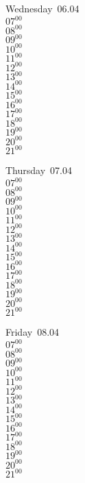 \documentclass[11pt,a4paper]{book}\usepackage[]{graphicx}\usepackage[]{color}
\begin{document}
\begin{weekdaybox}
  Wednesday~06.04\\
  { 
  \vfill
  $07^{00}$\\
$08^{00}$\\
$09^{00}$\\
$10^{00}$\\
$11^{00}$\\
$12^{00}$\\
$13^{00}$\\
$14^{00}$\\
$15^{00}$\\
$16^{00}$\\
$17^{00}$\\
$18^{00}$\\
$19^{00}$\\
$20^{00}$\\
$21^{00}$\\
  }
\end{weekdaybox}
\clearpage
\begin{headerbox}
\end{headerbox}
\begin{weekdaybox}
  Thursday~07.04\\
  { 
  \vfill
  $07^{00}$\\
$08^{00}$\\
$09^{00}$\\
$10^{00}$\\
$11^{00}$\\
$12^{00}$\\
$13^{00}$\\
$14^{00}$\\
$15^{00}$\\
$16^{00}$\\
$17^{00}$\\
$18^{00}$\\
$19^{00}$\\
$20^{00}$\\
$21^{00}$\\
  }
\end{weekdaybox} 
\begin{weekdaybox}
  Friday~08.04\\
  { 
  \vfill
  $07^{00}$\\
$08^{00}$\\
$09^{00}$\\
$10^{00}$\\
$11^{00}$\\
$12^{00}$\\
$13^{00}$\\
$14^{00}$\\
$15^{00}$\\
$16^{00}$\\
$17^{00}$\\
$18^{00}$\\
$19^{00}$\\
$20^{00}$\\
$21^{00}$\\
  }
\end{weekdaybox}
\end{document}
